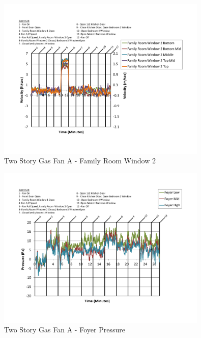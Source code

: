 \documentclass{article}
\begin{document}
\begin{appendices}
	\begin{figure}[H]
		\centering
		\includegraphics[height=3.05in,trim=0.67in 1.1in 0.67in 0.8in,clip=true]{0_Images/Results_Charts/ColdFlow/Two_Story/Gas/A/Family_Room_Window_2.pdf}
		\caption{Two Story Gas Fan A - Family Room Window 2}
	\end{figure}
 

	\begin{figure}[H]
		\centering
		\includegraphics[height=3.05in,trim=0.67in 1.1in 0.67in 0.8in,clip=true]{0_Images/Results_Charts/ColdFlow/Two_Story/Gas/A/Foyer_Pressure.pdf}
		\caption{Two Story Gas Fan A - Foyer Pressure}
	\end{figure}
 
	\clearpage


\end{appendices}
\end{document}
